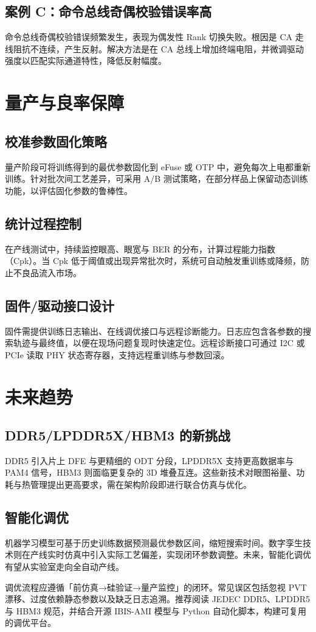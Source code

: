\section{案例 C：命令总线奇偶校验错误率高}
命令总线奇偶校验错误频繁发生，表现为偶发性 Rank 切换失败。根因是 CA 走线阻抗不连续，产生反射。解决方法是在 CA 总线上增加终端电阻，并微调驱动强度以匹配实际通道特性，降低反射幅度。\par
\chapter{量产与良率保障}
\section{校准参数固化策略}
量产阶段可将训练得到的最优参数固化到 eFuse 或 OTP 中，避免每次上电都重新训练。针对批次间工艺差异，可采用 A/B 测试策略，在部分样品上保留动态训练功能，以评估固化参数的鲁棒性。\par
\section{统计过程控制}
在产线测试中，持续监控眼高、眼宽与 BER 的分布，计算过程能力指数（Cpk）。当 Cpk 低于阈值或出现异常批次时，系统可自动触发重训练或降频，防止不良品流入市场。\par
\section{固件/驱动接口设计}
固件需提供训练日志输出、在线调优接口与远程诊断能力。日志应包含各参数的搜索轨迹与最终值，以便在现场问题复现时快速定位。远程诊断接口可通过 I2C 或 PCIe 读取 PHY 状态寄存器，支持远程重训练与参数回滚。\par
\chapter{未来趋势}
\section{DDR5/LPDDR5X/HBM3 的新挑战}
DDR5 引入片上 DFE 与更精细的 ODT 分段，LPDDR5X 支持更高数据率与 PAM4 信号，HBM3 则面临更复杂的 3D 堆叠互连。这些新技术对眼图裕量、功耗与热管理提出更高要求，需在架构阶段即进行联合仿真与优化。\par
\section{智能化调优}
机器学习模型可基于历史训练数据预测最优参数区间，缩短搜索时间。数字孪生技术则在产线实时仿真中引入实际工艺偏差，实现闭环参数调整。未来，智能化调优有望从实验室走向全自动产线。\par
调优流程应遵循「前仿真→硅验证→量产监控」的闭环。常见误区包括忽视 PVT 漂移、过度依赖静态参数以及缺乏日志追溯。推荐阅读 JEDEC DDR5、LPDDR5 与 HBM3 规范，并结合开源 IBIS-AMI 模型与 Python 自动化脚本，构建可复用的调优平台。\par
